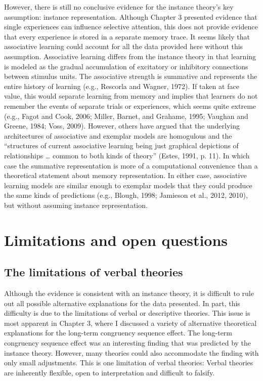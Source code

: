 \documentclass[]{DissertateCUNY}
\begin{document}
However, there is still no conclusive evidence for the instance theory's
key assumption: instance representation. Although Chapter 3 presented
evidence that single experiences can influence selective attention, this
does not provide evidence that every experience is stored in a separate
memory trace. It seems likely that associative learning could account
for all the data provided here without this assumption. Associative
learning differs from the instance theory in that learning is modeled as
the gradual accumulation of excitatory or inhibitory connections between
stimulus units. The associative strength is summative and represents the
entire history of learning (e.g., Rescorla and Wagner, 1972). If taken
at face value, this would separate learning from memory and implies that
learners do not remember the events of separate trials or experiences,
which seems quite extreme (e.g., Fagot and Cook, 2006; Miller, Barnet,
and Grahame, 1995; Vaughan and Greene, 1984; Voss, 2009). However,
others have argued that the underlying architectures of associative and
exemplar models are homogulous and the ``structures of current
associative learning being just graphical depictions of relationships
\ldots{} common to both kinds of theory'' (Estes, 1991, p. 11). In which
case the summative representation is more of a computational convenience
than a theoretical statement about memory representation. In either
case, associative learning models are similar enough to exemplar models
that they could produce the same kinds of predictions (e.g., Blough,
1998; Jamieson et al., 2012, 2010), but without assuming instance
representation.

\hypertarget{limitations-and-open-questions}{%
\section{Limitations and open
questions}\label{limitations-and-open-questions}}

\hypertarget{the-limitations-of-verbal-theories}{%
\subsection{The limitations of verbal
theories}\label{the-limitations-of-verbal-theories}}

Although the evidence is consistent with an instance theory, it is
difficult to rule out all possible alternative explanations for the data
presented. In part, this difficulty is due to the limitations of verbal
or descriptive theories. This issue is most apparent in Chapter 3, where
I discussed a variety of alternative theoretical explanations for the
long-term congruency sequence effect. The long-term congruency sequence
effect was an interesting finding that was predicted by the instance
theory. However, many theories could also accommodate the finding with
only small adjustments. This is one limitation of verbal theories:
Verbal theories are inherently flexible, open to interpretation and
difficult to falsify.
\end{document}
